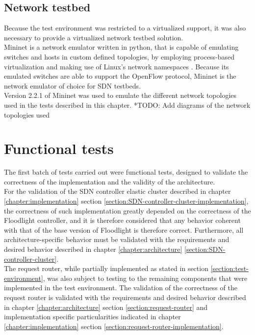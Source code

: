 \subsection{Network testbed}
\label{subsection:Mininet}
Because the test environment was restricted to a virtualized support, it was also necessary to provide a virtualized network testbed solution.\\
Mininet is a network emulator written in python, that is capable of emulating switches and hosts in custom defined topologies, by employing process-based virtualization and making use of Linux's network namespaces \cite{mininet}.
Because its emulated switches are able to support the OpenFlow protocol, Mininet is the network emulator of choice for \gls{SDN} testbeds.\\
Version 2.2.1 of Mininet was used to emulate the different network topologies used in the tests described in this chapter.
%
*TODO: Add diagrams of the network topologies used
%
%
\section{Functional tests}
\label{section:functional-tests}
The first batch of tests carried out were functional tests, designed to validate the correctness of the implementation and the validity of the architecture.\\
%
For the validation of the \gls{SDN} controller elastic cluster described in chapter \ref*{chapter:implementation} section \ref{section:SDN-controller-cluster-implementation}, the correctness of such implementation greatly depended on the correctness of the Floodlight controller, and it is therefore considered that any behavior coherent with that of the base version of Floodlight is therefore correct.
Furthermore, all architecture-specific behavior must be validated with the requirements and desired behavior described in chapter \ref*{chapter:architecture} \ref{section:SDN-controller-cluster}.\\
%
The request router, while partially implemented as stated in section \ref{section:test-environment}, was also subject to testing to the remaining components that were implemented in the test environment.
The validation of the correctness of the request router is validated with the requirements and desired behavior described in chapter \ref*{chapter:architecture} section \ref{section:request-router} and implementation specific particularities indicated in chapter \ref*{chapter:implementation} section \ref{section:request-router-implementation}.
%
%
